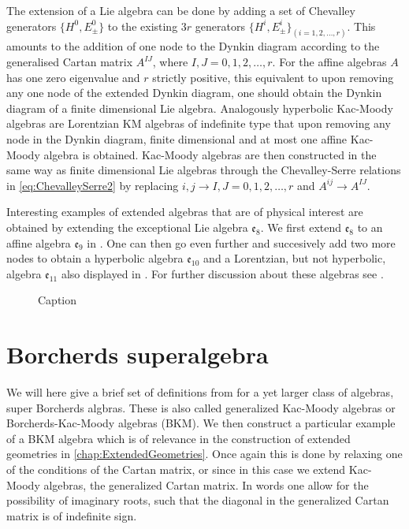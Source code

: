 \documentclass[11pt]{report}
\begin{document}
The extension of a Lie algebra can be done by adding a set of Chevalley generators $\{H^0,E_{\pm}^0\}$ to the existing $3r$ generators $\{H^i,E_\pm^i\}_{(i=1,2,\ldots,r)}$. This amounts to the addition of one node to the Dynkin diagram according to the generalised Cartan matrix $A^{IJ}$, where $I,J=0,1,2,\ldots, r$. For the affine algebras $A$ has one zero eigenvalue and $r$ strictly positive, this equivalent to upon removing any one node of the extended Dynkin diagram, one should obtain the Dynkin diagram of a finite dimensional Lie algebra. Analogously hyperbolic Kac-Moody algebras are Lorentzian KM algebras of indefinite type that upon removing any node in the Dynkin diagram, finite dimensional and at most one affine Kac-Moody algebra is obtained. Kac-Moody algebras are then constructed in the same way as finite dimensional Lie algebras through the Chevalley-Serre relations in \eqref{eq:ChevalleySerre2} by replacing $i,j\to I,J=0,1,2,\ldots,r$ and $A^{ij}\to A^{IJ}$.

Interesting examples of extended algebras that are of physical interest are obtained by extending the exceptional Lie algebra $\mathfrak{e}_8$. We first extend $\mathfrak{e}_8$ to an affine algebra $\mathfrak{e}_9$ in . One can then go even further and succesively add two more nodes to obtain a hyperbolic algebra $\mathfrak{e}_{10}$ and a Lorentzian, but not hyperbolic, algebra $\mathfrak{e}_{11}$ also displayed in . For further discussion about these algebras see \cite{PhdJakob2009,PhdDaniel2010}.
\begin{figure}
    \caption{Caption}
    \label{fig:DynkinEseries}
\end{figure}


\section{Borcherds superalgebra}\label{sec:Borcherds}

We will here give a brief set of definitions from \cite{Ray2006} for a yet larger class of algebras, super Borcherds algbras. These is also called generalized Kac-Moody algebras or Borcherds-Kac-Moody algebras (BKM). We then construct a particular example of a BKM algebra which is of relevance in the construction of extended geometries in \ref{chap:ExtendedGeometries}. Once again this is done by relaxing one of the conditions of the Cartan matrix, or since in this case we extend Kac-Moody algebras, the generalized Cartan matrix. In words one allow for the possibility of imaginary roots, such that the diagonal in the generalized Cartan matrix is of indefinite sign.
\end{document}
